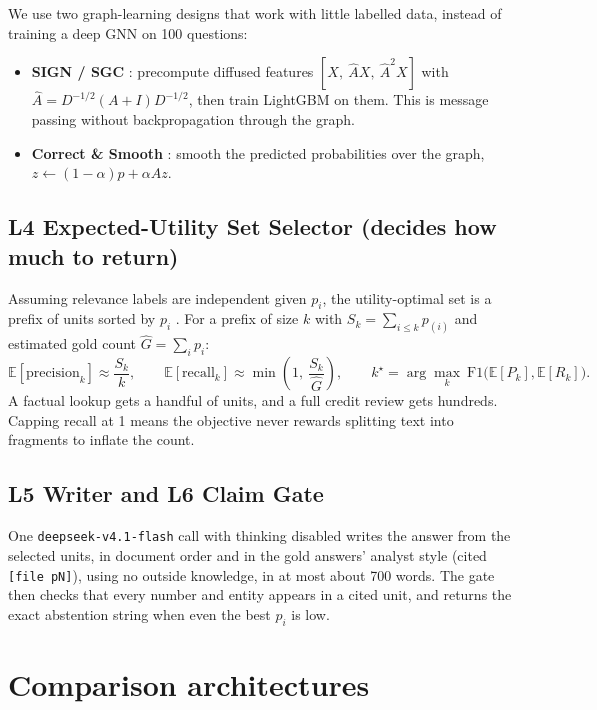 \documentclass[10pt,a4paper]{article}
\begin{document}
We use two graph-learning designs that work with little labelled data, instead of training a deep GNN on 100 questions:
\begin{itemize}
\item \textbf{SIGN / SGC} \cite{sign,sgc}: precompute diffused features $[X,\ \hat A X,\ \hat A^2 X]$ with $\hat A = D^{-1/2}(A+I)D^{-1/2}$, then train LightGBM on them. This is message passing without backpropagation through the graph.
\item \textbf{Correct \& Smooth} \cite{cands}: smooth the predicted probabilities over the graph, $z \leftarrow (1-\alpha)p + \alpha \hat A z$.
\end{itemize}

\subsection*{L4 Expected-Utility Set Selector (decides how much to return)}
Assuming relevance labels are independent given $p_i$, the utility-optimal set is a prefix of units sorted by $p_i$ \cite{ye2012}.
For a prefix of size $k$ with $S_k=\sum_{i\le k}p_{(i)}$ and estimated gold count $\hat G=\sum_i p_i$:
\[
\mathbb{E}[\text{precision}_k]\approx \frac{S_k}{k}, \qquad \mathbb{E}[\text{recall}_k]\approx \min\!\left(1,\ \frac{S_k}{\hat G}\right), \qquad k^\star=\arg\max_k \ \mathrm{F1}\big(\mathbb{E}[P_k],\mathbb{E}[R_k]\big).
\]
A factual lookup gets a handful of units, and a full credit review gets hundreds.
Capping recall at 1 means the objective never rewards splitting text into fragments to inflate the count.

\subsection*{L5 Writer and L6 Claim Gate}
One \texttt{deepseek-v4.1-flash} call with thinking disabled writes the answer from the selected units, in document order and in the gold answers' analyst style (cited \texttt{[file pN]}), using no outside knowledge, in at most about 700 words.
The gate then checks that every number and entity appears in a cited unit, and returns the exact abstention string when even the best $p_i$ is low.

\section{Comparison architectures}
\end{document}
